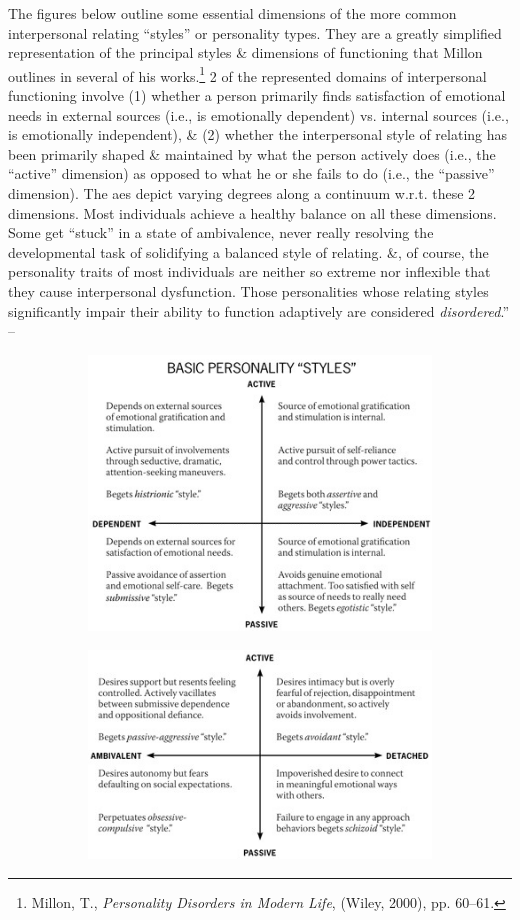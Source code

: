 \documentclass{article}
\numberwithin{equation}{section}
\begin{document}
The figures below outline some essential dimensions of the more common interpersonal relating ``styles'' or personality types. They are a greatly simplified representation of the principal styles \& dimensions of functioning that Millon outlines in several of his works.\footnote{Millon, T., \textit{Personality Disorders in Modern Life}, (Wiley, 2000), pp. 60--61.} 2 of the represented domains of interpersonal functioning involve (1) whether a person primarily finds satisfaction of emotional needs in external sources (i.e., is emotionally dependent) vs. internal sources (i.e., is emotionally independent), \& (2) whether the interpersonal style of relating has been primarily shaped \& maintained by what the person actively does (i.e., the ``active'' dimension) as opposed to what he or she fails to do (i.e., the ``passive'' dimension). The aes depict varying degrees along a continuum w.r.t. these 2 dimensions. Most individuals achieve a healthy balance on all these dimensions. Some get ``stuck'' in a state of ambivalence, never really resolving the developmental task of solidifying a balanced style of relating. \&, of course, the personality traits of most individuals are neither so extreme nor inflexible that they cause interpersonal dysfunction. Those personalities whose relating styles significantly impair their ability to function adaptively are considered \textit{disordered}.'' -- \cite[pp. 54--56]{Simon2011}
\begin{figure}[H]
	\centering
	\begin{subfigure}[b]{0.49\textwidth}
		\centering
		\includegraphics[scale=0.55]{Simon2011_3}
	\end{subfigure}
	\begin{subfigure}[b]{0.49\textwidth}
		\centering
		\includegraphics[scale=0.55]{Simon2011_4}
	\end{subfigure}
\end{figure}
\end{document}
